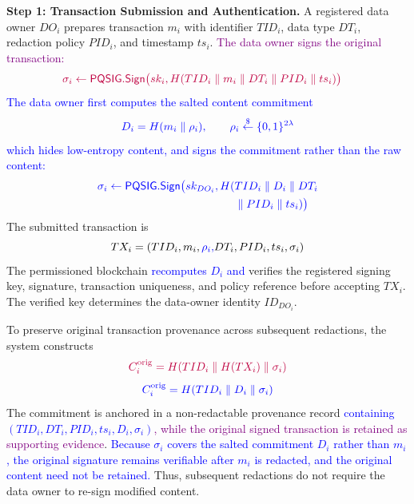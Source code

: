 \documentclass[lettersize,journal]{IEEEtran}
\begin{document}
\medskip
\noindent\textbf{Step 1: Transaction Submission and
Authentication.}
A registered data owner $DO_i$ prepares transaction
$m_i$ with identifier $TID_i$, data type $DT_i$,
redaction policy $PID_i$, and timestamp $ts_i$.
\textcolor{purple}{The data owner signs the original transaction:}
\begin{equation}
{\color{purple}
\begin{aligned}
\sigma_i\leftarrow
\mathsf{PQSIG.Sign}\big(
sk_i,H(&TID_i\parallel m_i\parallel DT_i\parallel PID_i\parallel ts_i)\big)
\end{aligned}}
\end{equation}
\textcolor{blue}{The data owner first computes the salted content commitment}
\begin{equation}
{\color{blue}D_i=H(m_i\parallel\rho_i),\qquad
\rho_i\stackrel{\$}{\leftarrow}\{0,1\}^{2\lambda}}
\end{equation}
\textcolor{blue}{which hides low-entropy content, and signs the commitment
rather than the raw content:}
\begin{equation}
{\color{blue}
\begin{aligned}
\sigma_i\leftarrow
\mathsf{PQSIG.Sign}\big(
sk_{DO_i},H(&TID_i\parallel D_i\parallel DT_i\\
&\parallel PID_i\parallel ts_i)\big)
\end{aligned}}
\end{equation}
The submitted transaction is
\begin{equation}
TX_i=(TID_i,m_i,\textcolor{blue}{\rho_i,}DT_i,PID_i,ts_i,\sigma_i)
\end{equation}
The permissioned blockchain \textcolor{blue}{recomputes $D_i$ and} verifies the registered
signing key, signature, transaction uniqueness, and
policy reference before accepting $TX_i$. The
verified key determines the data-owner identity
$ID_{DO_i}$.

To preserve original transaction provenance across
subsequent redactions, the system constructs
\begin{equation}
{\color{purple}C_i^{\mathrm{orig}}=
H(TID_i\parallel H(TX_i)\parallel\sigma_i)}
\end{equation}
\begin{equation}
{\color{blue}C_i^{\mathrm{orig}}=
H(TID_i\parallel D_i\parallel\sigma_i)}
\end{equation}
The commitment is anchored in a non-redactable
provenance record\textcolor{blue}{ containing
$(TID_i,DT_i,PID_i,ts_i,D_i,\sigma_i)$}\textcolor{purple}{, while the original signed
transaction is retained as supporting evidence}.
\textcolor{blue}{Because $\sigma_i$ covers the salted commitment $D_i$
rather than $m_i$, the original signature remains verifiable after
$m_i$ is redacted, and the original content need not be retained.}
Thus, subsequent redactions do not require the
data owner to re-sign modified content.
\end{document}
